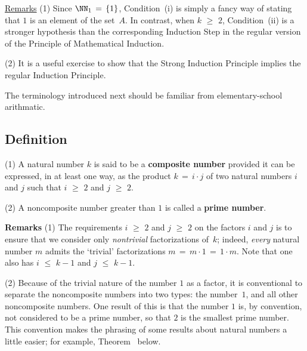 \V

        \underline{Remarks} (1) Since ${\NN}_{1} \,=\, \{1\}$, Condition~(i) is simply a fancy way of stating that $1$ is an element of the set~$A$.
    In contrast, when $k\,\,{\geq}\,\,2$, Condition~(ii) is a stronger hypothesis than the corresponding Induction Step in the regular version of the Principle of Mathematical Induction.

\V

        (2) It is a useful exercise to show that the Strong Induction Principle implies the regular Induction Principle. %

\V

        The terminology introduced next should be familiar from elementary-school arithmatic.


            \subsection{\small{\bf Definition}}
            \label{DefA20.04B}

\hspace*{\parindent} (1) A natural number $k$ is said to be a {\bf composite number} provided it can be expressed, in at least one way,
    as the product $k \,=\, i{\cdot}j$ of two natural numbers $i$ and $j$ such that $i\,\,{\geq}\,\,2$ and $j\,\,{\geq}\,\,2$.

\V


        (2) A noncomposite number greater than $1$ is called a {\bf prime number}.
\V

        {\bf Remarks} (1) The requirements $i\,\,{\geq}\,\,2$ and $j\,\,{\geq}\,\,2$ on the factors $i$ and $j$ is to ensure that we consider only {\em nontrivial} factorizations of~$k$;
    indeed, {\em every} natural number $m$ admits the `trivial' factorizations $m \,=\, m{\cdot}1 \,=\, 1{\cdot}m$. Note that one also has $i\,\,{\leq}\,\,k-1$ and $j\,\,{\leq}\,\,k-1$.

\V

        (2) Because of the trivial nature of the number $1$ as a factor, it is conventional to separate the noncomposite numbers into two types: the number~$1$, and all other noncomposite numbers.
    One result of this is that the number $1$ is, by convention, not considered to be a prime number, so that $2$ is the smallest prime number.
    This convention makes the phrasing of some results about natural numbers a little easier; for example, Theorem~ below.

